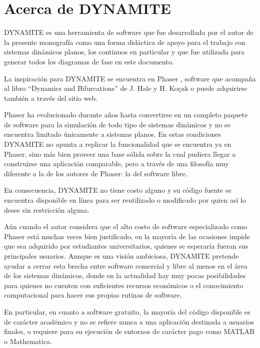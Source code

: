 \chapter{Acerca de DYNAMITE} \label{chap:dynamite}

DYNAMITE es una herramienta de software que fue desarrollada por el autor de la presente monografía como una forma didáctica de apoyo para el trabajo con sistemas dinámicos planos, los continuos en particular y que fue utilizada para generar todos los diagramas de fase en este documento.

La inspiración para DYNAMITE se encuentra en Phaser \cite{phaser}, software que acompaña al libro ``Dynamics and Bifurcations'' \cite{dynandbif} de J. Hale y H. Ko\c{c}ak o puede adquirirse también a través del sitio web.

Phaser ha evolucionado durante años hasta convertirse en un completo paquete de software para la simulación de todo tipo de sistemas dinámicos y no se encuentra limitado únicamente a sistemas planos. En estas condiciones DYNAMITE no apunta a replicar la funcionalidad que se encuentra ya en Phaser, sino más bien proveer una base sólida sobre la cual pudiera llegar a construirse una aplicación comparable, pero a través de una filosofía muy diferente a la de los autores de Phaser: la del software libre.

En consecuencia, DYNAMITE no tiene costo alguno y su código fuente se encuentra disponible en línea \cite{dynamite} para ser reutilizado o modificado por quien así lo desee sin restricción alguna.

Aún cuando el autor considera que el alto costo de software especializado como Phaser está muchas veces bien justificado, en la mayoría de las ocasiones impide que sea adquirido por estudiantes universitarios, quienes se esperaría fueran sus principales usuarios.
Aunque es una visión ambiciosa, DYNAMITE pretende ayudar a cerrar esta brecha entre software comercial y libre al menos en el área de los sistemas dinámicos, donde en la actualidad hay muy pocas posibilidades para quienes no cuenten con suficientes recursos económicos o el conocimiento computacional para hacer sus propias rutinas de software.

En particular, en cuanto a software gratuito, la mayoría del código disponible es de carácter académico \cite{chaospython,chaosatmaryland,stonydynamics,cornelldynamics} y no se refiere nunca a una aplicación destinada a usuarios finales, o requiere para su ejecución de entornos de carácter pago como MATLAB o Mathematica.

